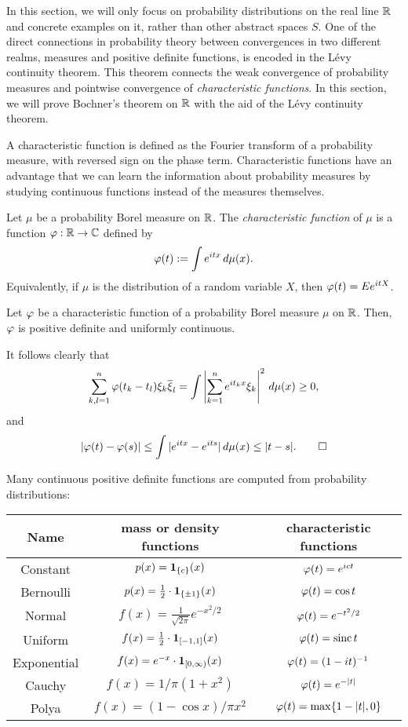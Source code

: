 \documentclass[a4paper]{article}
\begin{document}
In this section, we will only focus on probability distributions on the real line $\mathbb{R}$ and concrete examples on it, rather than other abstract spaces $S$.
One of the direct connections in probability theory between convergences in two different realms, measures and positive definite functions, is encoded in the L\'evy continuity theorem.
This theorem connects the weak convergence of probability measures and pointwise convergence of \emph{characteristic functions}.
In this section, we will prove Bochner's theorem on $\mathbb{R}$ with the aid of the L\'evy continuity theorem.

A characteristic function is defined as the Fourier transform of a probability measure, with reversed sign on the phase term.
Characteristic functions have an advantage that we can learn the information about probability measures by studying continuous functions instead of the measures themselves.

\begin{defn}
Let $\mu$ be a probability Borel measure on $\mathbb{R}$.
The \emph{characteristic function} of $\mu$ is a function $\varphi:\mathbb{R}\to\mathbb{C}$ defined by
\[\varphi(t):=\int e^{itx}\,d\mu(x).\]
Equivalently, if $\mu$ is the distribution of a random variable $X$, then $\varphi(t)=Ee^{itX}$.
\end{defn}

\begin{prop}
Let $\varphi$ be a characteristic function of a probability Borel measure $\mu$ on $\mathbb{R}$.
Then, $\varphi$ is positive definite and uniformly continuous.
\end{prop}
\begin{pf}
It follows clearly that
\[\sum_{k,l=1}^n\varphi(t_k-t_l)\xi_k\overline\xi_l=\int\left|\sum_{k=1}^ne^{it_kx}\xi_k\right|^2\,d\mu(x)\ge0,\]
and
\[|\varphi(t)-\varphi(s)|\le\int|e^{itx}-e^{its}|\,d\mu(x)\le|t-s|.\qedhere\]
\end{pf}
\begin{ex}
Many continuous positive definite functions are computed from probability distributions:
\begin{center}\renewcommand{\arraystretch}{1.8}
\begin{tabular}{ccc}
Name & mass or density functions & characteristic functions\\\hline
Constant & $p(x)=\mathbf{1}_{\{c\}}(x)$ & $\varphi(t)=e^{ict}$\\
Bernoulli & $p(x)=\frac12\cdot\mathbf{1}_{\{\pm1\}}(x)$ & $\varphi(t)=\cos t$\\
Normal & $f(x)=\frac1{\sqrt{2\pi}}e^{-x^2/2}$ & $\varphi(t)=e^{-t^2/2}$\\
Uniform & $f(x)=\frac12\cdot\mathbf{1}_{[-1,1]}(x)$ & $\varphi(t)=\operatorname{sinc}t$\\
Exponential & $f(x)=e^{-x}\cdot\mathbf{1}_{[0,\infty)}(x)$ & $\varphi(t)=(1-it)^{-1}$\\
Cauchy & $f(x)=1/\pi(1+x^2)$ & $\varphi(t)=e^{-|t|}$\\
Polya & $f(x)=(1-\cos x)/\pi x^2$ & $\varphi(t)=\max\{1-|t|,0\}$
\end{tabular}
\end{center}
\end{ex}
\end{document}
